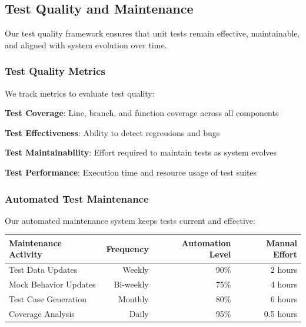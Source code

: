 \subsection*{Test Quality and Maintenance}

Our test quality framework ensures that unit tests remain effective, maintainable, and aligned with system evolution over time.

\subsubsection*{Test Quality Metrics}

We track metrics to evaluate test quality:

\begin{expandedlist}
    \item \textbf{Test Coverage}: Line, branch, and function coverage across all components
    \item \textbf{Test Effectiveness}: Ability to detect regressions and bugs
    \item \textbf{Test Maintainability}: Effort required to maintain tests as system evolves
    \item \textbf{Test Performance}: Execution time and resource usage of test suites
\end{expandedlist}

\subsubsection*{Automated Test Maintenance}

Our automated maintenance system keeps tests current and effective:

\begin{center}
\begin{tabular}{@{}lrrr@{}}
\toprule
\textbf{Maintenance Activity} & \textbf{Frequency} & \textbf{Automation Level} & \textbf{Manual Effort} \\
\midrule
Test Data Updates & Weekly & 90\% & 2 hours \\
Mock Behavior Updates & Bi-weekly & 75\% & 4 hours \\
Test Case Generation & Monthly & 80\% & 6 hours \\
Coverage Analysis & Daily & 95\% & 0.5 hours \\
\bottomrule
\end{tabular}
\end{center}

